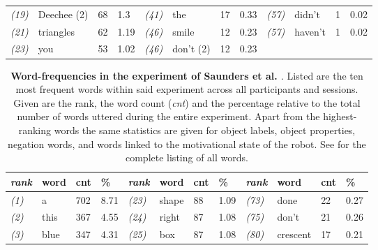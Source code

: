 \begin{screenonly}
\begin{table*}[h]
\begin{tabular*}{\hsize}{@{\extracolsep{\fill}}llllllllllll}
    \textsl{(19)} & Deechee (2) & 68 & 1.3 & \hspace*{2ex}\textsl{(41)} & the & 17 & 0.33 & \hspace*{2ex}\textsl{(57)} & didn't & 1 & 0.02\\
    \textsl{(21)} & triangles & 62 & 1.19 & \hspace*{2ex}\textsl{(46)} & smile & 12 & 0.23 & \hspace*{2ex}\textsl{(57)} & haven't & 1 & 0.02\\
    \textsl{(23)} & you & 53 & 1.02 & \hspace*{2ex}\textsl{(46)} & don't (2) & 12 & 0.23 & \\
    \bottomrule
  \end{tabular*}
\end{table*}
\begin{table*}[h]
\caption{\textbf{Word-frequencies in the experiment of Saunders et al. \cite{Saunders2012}}. Listed are the ten most frequent words
    within said experiment across all participants and sessions. Given are the rank, the word count (\emph{cnt}) and the
    percentage relative to the total number of words uttered during the entire experiment. Apart from the highest-ranking words the same
    statistics are given for object labels, object properties, negation words, and words linked to the motivational state of the robot.
    See \cite{Foerster2013} for the complete listing of all words.}
  \label{tbl_wf_s}
  \begin{tabular*}{\hsize}{@{\extracolsep{\fill}}llllllllllll}
    \textsl{rank} & word & cnt & \% & \hspace*{2ex}\textsl{rank} & word & cnt & \% & \hspace*{2ex}\textsl{rank} & word & cnt & \% \\
    \toprule
    \textsl{(1)} & a & 702 & 8.71 & \hspace*{2ex}\textsl{(23)} & shape & 88 & 1.09 & \hspace*{2ex}\textsl{(73)} & done & 22 & 0.27\\
    \textsl{(2)} & this & 367 & 4.55 & \hspace*{2ex}\textsl{(24)} & right & 87 & 1.08 & \hspace*{2ex}\textsl{(75)} & don't & 21 & 0.26\\
    \textsl{(3)} & blue & 347 & 4.31 & \hspace*{2ex}\textsl{(25)} & box & 87 & 1.08 & \hspace*{2ex}\textsl{(80)} & crescent & 17 & 0.21\\

\end{tabular*}
\end{table*}
\end{screenonly}
